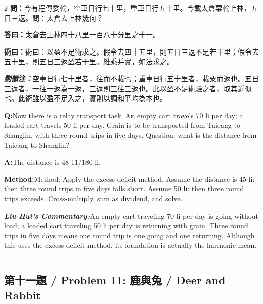 \documentclass[11pt,a4paper]{article}
\newcommand{\cnwen}{\textcolor{cnlabelfg}{\textbf{問：}}}
\newcommand{\cnda}{\textbf{答曰：}}
\newcommand{\cnshu}{\textcolor{cnlabelfg}{\textbf{術曰：}}}
\newcommand{\cnzhu}{\textcolor{commentarycolor}{\textit{\textbf{劉徽注：}}}}
\newcommand{\enwen}{\textcolor{enlabelfg}{\textbf{Q:}}}
\newcommand{\enda}{\textcolor{enlabelfg}{\textbf{A:}}}
\newcommand{\enshu}{\textcolor{enlabelfg}{\textbf{Method:}}}
\newcommand{\enzhu}{\textcolor{enlabelfg}{\textit{\textbf{Liu Hui's Commentary:}}}}
\begin{document}
\begin{paracol}{2}
\switchcolumn[0]
\cnwen 今有程傳委輸，空車日行七十里，重車日行五十里。今載太倉粟輸上林，五日三返。問：太倉去上林幾何？

\cnda 太倉去上林四十八里一百八十分里之十一。

\cnshu 術曰：以盈不足術求之。假令去四十五里，則五日三返不足若干里；假令去五十里，則五日三返盈若干里。維乘并實，如法求之。

\cnzhu 空車日行七十里者，往而不載也；重車日行五十里者，載粟而返也。五日三返者，一往一返為一返，三返則三往三返也。此以盈不足術驗之者，取其近似也。此術雖以盈不足入之，實則以調和平均為本也。

\switchcolumn[1]
\enwen Now there is a relay transport task. An empty cart travels 70 li per day; a loaded cart travels 50 li per day. Grain is to be transported from Taicang to Shanglin, with three round trips in five days. Question: what is the distance from Taicang to Shanglin?

\enda The distance is 48 11/180 li.

\enshu Method: Apply the excess-deficit method. Assume the distance is 45 li: then three round trips in five days falls short. Assume 50 li: then three round trips exceeds. Cross-multiply, sum as dividend, and solve.

\enzhu An empty cart traveling 70 li per day is going without load; a loaded cart traveling 50 li per day is returning with grain. Three round trips in five days means one round trip is one going and one returning. Although this uses the excess-deficit method, its foundation is actually the harmonic mean.
\end{paracol}

\bigskip\hrule\bigskip

\subsection{第十一題 / Problem 11: 鹿與兔 / Deer and Rabbit}
\end{document}
